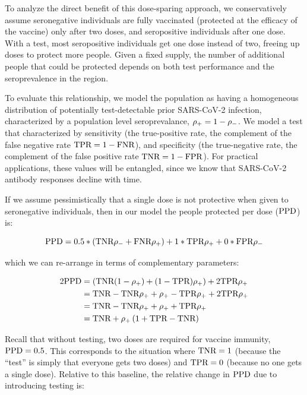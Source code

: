 \documentclass[10pt,a4paper,twocolumn]{article}
\begin{document}
To analyze the direct benefit of this dose-sparing approach, we conservatively assume seronegative individuals are fully vaccinated (\ie* protected at the efficacy of the vaccine) only after two doses, and seropositive individuals after one dose. With a test, most seropositive individuals get one dose instead of two, freeing up doses to protect more people. Given a fixed supply, the number of additional people that could be protected depends on both test performance and the seroprevalence in the region.

To evaluate this relationship, we model the population as having a homogeneous distribution of potentially test-detectable prior SARS-CoV-2 infection,  characterized by a population level seroprevalance, $\rho_{{+}} = 1 - \rho_{{-}}$. We model a test that characterized by sensitivity (the true-positive rate, the complement of the false negative rate $\textrm{TPR} = 1 - \textrm{FNR}$), and specificity (the true-negative rate, the complement of the false positive rate $\textrm{TNR} = 1 - \textrm{FPR}$). For practical applications, these values will be entangled, since we know that \eg* SARS-CoV-2 antibody responses decline with time\cite{HARRIS2021}.

If we assume pessimistically that a single dose is not protective when given to seronegative individuals, then in our model the people protected per dose ($\textrm{PPD}$) is:

$$
\textrm{PPD} = 0.5*\left(\textrm{TNR}\rho_{{-}} + \textrm{FNR}\rho_{{+}}\right) + 1*\textrm{TPR}\rho_{{+}} + 0*\textrm{FPR}\rho_{{-}}
$$

which we can re-arrange in terms of complementary parameters:

\begin{equation}\label{ppd}
\begin{aligned}
2\textrm{PPD} &= \left(\textrm{TNR}(1-\rho_{{+}}) + (1-\textrm{TPR})\rho_{{+}}\right) + 2\textrm{TPR}\rho_{{+}} \\
&= \textrm{TNR}-\textrm{TNR}\rho_{{+}} + \rho_{{+}} - \textrm{TPR}\rho_{{+}} + 2\textrm{TPR}\rho_{{+}} \\
&= \textrm{TNR} - \textrm{TNR}\rho_{{+}} + \rho_{{+}} + \textrm{TPR}\rho_{{+}} \\
&= \textrm{TNR} + \rho_{{+}}\left(1 + \textrm{TPR}-\textrm{TNR}\right)
\end{aligned}
\end{equation}

Recall that without testing, two doses are required for vaccine immunity, \ie* $\textrm{PPD}=0.5$. This corresponds to the situation where $\textrm{TNR}=1$ (because the ``test'' is simply that everyone gets two doses) and $\textrm{TPR}=0$ (because no one gets a single dose). Relative to this baseline, the relative change in $\textrm{PPD}$ due to introducing testing is:
\end{document}
